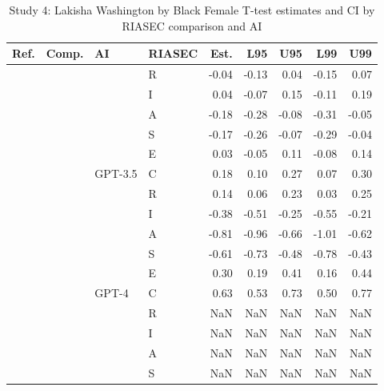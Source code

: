 \begin{table}

\caption{Study 4: Lakisha Washington by Black Female T-test estimates and CI by RIASEC comparison and AI}
\centering
\fontsize{8}{10}\selectfont
\begin{tabular}[t]{llllrrrrr}
\toprule
Ref. & Comp. & AI & RIASEC & Est. & L95 & U95 & L99 & U99\\
\midrule
 &  &  & R & -0.04 & -0.13 & 0.04 & -0.15 & 0.07\\

 &  &  & I & 0.04 & -0.07 & 0.15 & -0.11 & 0.19\\

 &  &  & A & -0.18 & -0.28 & -0.08 & -0.31 & -0.05\\

 &  &  & S & -0.17 & -0.26 & -0.07 & -0.29 & -0.04\\

 &  &  & E & 0.03 & -0.05 & 0.11 & -0.08 & 0.14\\

 &  & \multirow[t]{-6}{*}{\raggedright\arraybackslash GPT-3.5} & C & 0.18 & 0.10 & 0.27 & 0.07 & 0.30\\

 &  &  & R & 0.14 & 0.06 & 0.23 & 0.03 & 0.25\\

 &  &  & I & -0.38 & -0.51 & -0.25 & -0.55 & -0.21\\

 &  &  & A & -0.81 & -0.96 & -0.66 & -1.01 & -0.62\\

 &  &  & S & -0.61 & -0.73 & -0.48 & -0.78 & -0.43\\

 &  &  & E & 0.30 & 0.19 & 0.41 & 0.16 & 0.44\\

 &  & \multirow[t]{-6}{*}{\raggedright\arraybackslash GPT-4} & C & 0.63 & 0.53 & 0.73 & 0.50 & 0.77\\

 &  &  & R & NaN & NaN & NaN & NaN & NaN\\

 &  &  & I & NaN & NaN & NaN & NaN & NaN\\

 &  &  & A & NaN & NaN & NaN & NaN & NaN\\

 &  &  & S & NaN & NaN & NaN & NaN & NaN\\


\end{tabular}
\end{table}
